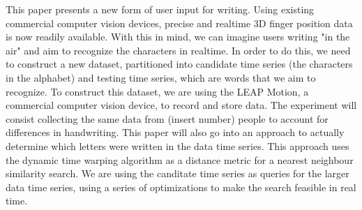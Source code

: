 This paper presents a new form of user input for writing. Using existing commercial computer vision devices, precise and realtime 3D finger position data is now readily available. With this in mind, we can imagine users writing "in the air" and aim to recognize the characters in realtime. In order to do this, we need to construct a new dataset, partitioned into candidate time series (the characters in the alphabet) and testing time series, which are words that we aim to recognize. To construct this dataset, we are using the LEAP Motion, a commercial computer vision device, to record and store data. The experiment will consist collecting the same data from  (insert number) people to account for differences in handwriting. This paper will also go into an approach to actually determine which letters were written in the data time series. This approach uses the dynamic time warping algorithm as a distance metric for a nearest neighbour similarity search. We are using the canditate time series as queries for the larger data time series, using a series of optimizations to make the search feasible in real time. 
